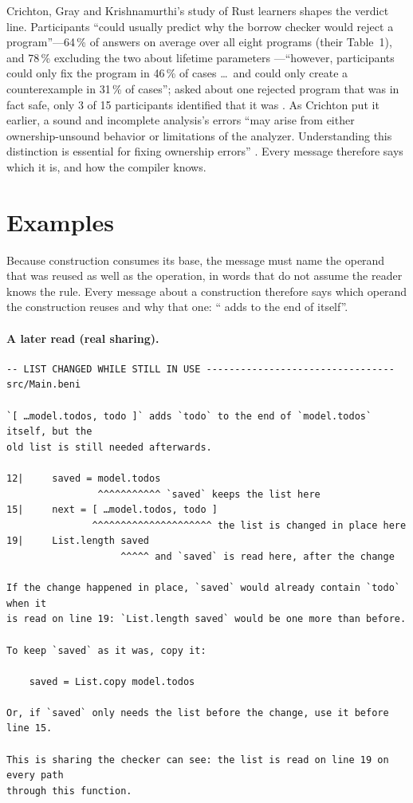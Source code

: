 Crichton, Gray and Krishnamurthi's study of Rust learners shapes the verdict line. Participants ``could
usually predict why the borrow checker would reject a program''---64\,\% of answers on average over all
eight programs (their Table~1), and 78\,\% excluding the two about lifetime parameters
\citep[\S2.5]{crichton2023grounded}---``however, participants could only fix the program in 46\,\% of
cases \ldots\ and could only create a counterexample in 31\,\% of cases''; asked about one rejected
program that was in fact safe, only 3 of 15 participants identified that it was
\citep[\S2.4]{crichton2023grounded}. As Crichton put it earlier, a sound and incomplete analysis's
errors ``may arise from either ownership-unsound behavior or limitations of the analyzer.
Understanding this distinction is essential for fixing ownership errors''
\citep{crichton2020usability}. Every message therefore says which it is, and how the compiler knows.

\section{Examples}
\label{sec:errors-examples}

Because construction consumes its base, the message must name the operand that was reused as well as
the operation, in words that do not assume the reader knows the rule. Every message about a
construction therefore says which operand the construction reuses and why that one: ``\code{[ …acc, x ]}
adds  to the end of  itself''.

\paragraph{A later read (real sharing).}
\begin{Verbatim}
-- LIST CHANGED WHILE STILL IN USE --------------------------------- src/Main.beni

`[ …model.todos, todo ]` adds `todo` to the end of `model.todos` itself, but the
old list is still needed afterwards.

12|     saved = model.todos
                ^^^^^^^^^^^ `saved` keeps the list here
15|     next = [ …model.todos, todo ]
               ^^^^^^^^^^^^^^^^^^^^^ the list is changed in place here
19|     List.length saved
                    ^^^^^ and `saved` is read here, after the change

If the change happened in place, `saved` would already contain `todo` when it
is read on line 19: `List.length saved` would be one more than before.

To keep `saved` as it was, copy it:

    saved = List.copy model.todos

Or, if `saved` only needs the list before the change, use it before line 15.

This is sharing the checker can see: the list is read on line 19 on every path
through this function.
\end{Verbatim}

